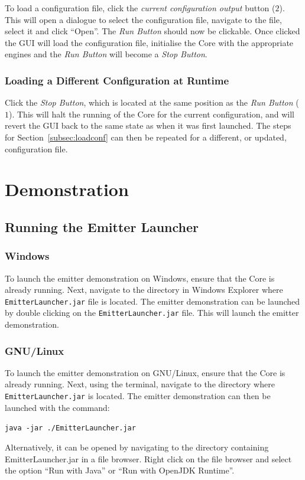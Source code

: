 \documentclass[10pt,a4paper]{article}
\begin{document}
To load a configuration file, click the \emph{current configuration output} button ($2$). This will open a dialogue to select the configuration file, navigate to the file, select it and click ``Open''. The \emph{Run Button} should now be clickable. Once clicked the GUI will load the configuration file, initialise the Core with the appropriate engines and the \emph{Run Button} will become a \emph{Stop Button}.

\subsubsection{Loading a Different Configuration at Runtime}

Click the \emph{Stop Button}, which is located at the same position as the \emph{Run Button} ($1$). This will halt the running of the Core for the current configuration, and will revert the GUI back to the same state as when it was first launched. The steps for Section~\ref{subsec:loadconf} can then be repeated for a different, or updated, configuration file.

\section{Demonstration}
\label{subsec:demo}
\subsection{Running the Emitter Launcher}
\subsubsection{Windows}
To launch the emitter demonstration on Windows, ensure that the Core is already running. Next, navigate to the directory in Windows Explorer where \texttt{EmitterLauncher.jar} file is located. The emitter demonstration can be launched by double clicking on the \texttt{EmitterLauncher.jar} file. This will launch the emitter demonstration.
\subsubsection{GNU/Linux}
To launch the emitter demonstration on GNU/Linux, ensure that the Core is already running. Next, using the terminal, navigate to the directory where \texttt{EmitterLauncher.jar} is located. The emitter demonstration can then be launched with the command:
\begin{center}
\texttt{java -jar ./EmitterLauncher.jar}
\end{center}
Alternatively, it can be opened by navigating to the directory containing EmitterLauncher.jar in a file browser. Right click on the file browser and select the option ``Run with Java'' or ``Run with OpenJDK Runtime''.
\end{document}
